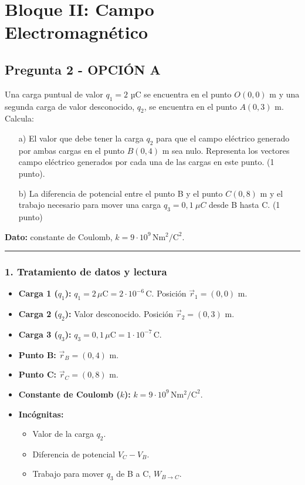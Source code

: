 \newpage

\section{Bloque II: Campo Electromagnético}
\label{sec:em_2025_jul_ext}

\subsection{Pregunta 2 - OPCIÓN A}
\label{subsec:2A_2025_jul_ext}

\begin{cajaenunciado}
Una carga puntual de valor $q_{1}=2$ µC se encuentra en el punto $O(0,0)$ m y una segunda carga de valor desconocido, $q_{2}$, se encuentra en el punto $A(0,3)$ m. Calcula:
\begin{enumerate}
    \item[a)] El valor que debe tener la carga $q_{2}$ para que el campo eléctrico generado por ambas cargas en el punto $B(0,4)$ m sea nulo. Representa los vectores campo eléctrico generados por cada una de las cargas en este punto. (1 punto).
    \item[b)] La diferencia de potencial entre el punto B y el punto $C(0,8)$ m y el trabajo necesario para mover una carga $q_{3}=0,1~\mu C$ desde B hasta C. (1 punto)
\end{enumerate}
\textbf{Dato:} constante de Coulomb, $k=9\cdot10^{9}\,\text{N}\text{m}^2/\text{C}^2$.
\end{cajaenunciado}
\hrule

\subsubsection*{1. Tratamiento de datos y lectura}
\begin{itemize}
    \item \textbf{Carga 1 ($q_1$):} $q_1 = 2 \, \mu\text{C} = 2 \cdot 10^{-6} \, \text{C}$. Posición $\vec{r}_1 = (0,0)$ m.
    \item \textbf{Carga 2 ($q_2$):} Valor desconocido. Posición $\vec{r}_2 = (0,3)$ m.
    \item \textbf{Carga 3 ($q_3$):} $q_3 = 0,1 \, \mu\text{C} = 1 \cdot 10^{-7} \, \text{C}$.
    \item \textbf{Punto B:} $\vec{r}_B = (0,4)$ m.
    \item \textbf{Punto C:} $\vec{r}_C = (0,8)$ m.
    \item \textbf{Constante de Coulomb ($k$):} $k=9\cdot10^{9}\,\text{N}\text{m}^2/\text{C}^2$.
    \item \textbf{Incógnitas:}
    \begin{itemize}
        \item Valor de la carga $q_2$.
        \item Diferencia de potencial $V_C - V_B$.
        \item Trabajo para mover $q_3$ de B a C, $W_{B \to C}$.
    \end{itemize}
\end{itemize}

